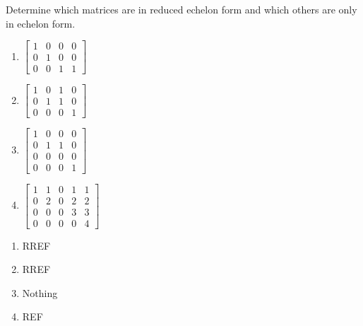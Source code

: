\documentclass{../mathhomework}
\begin{document}
\begin{problem}[1.2\#1]
    Determine which matrices are in reduced echelon form and which others are only in echelon form.
    \begin{enumerate}[label=(\alph*)]
        \item $\begin{bmatrix}
            1 & 0 & 0 & 0 \\
            0 & 1 & 0 & 0 \\
            0 & 0 & 1 & 1
        \end{bmatrix}$
        \item $\begin{bmatrix}
            1 & 0 & 1 & 0 \\
            0 & 1 & 1 & 0 \\
            0 & 0 & 0 & 1
        \end{bmatrix}$
        \item $\begin{bmatrix}
            1 & 0 & 0 & 0 \\
            0 & 1 & 1 & 0 \\
            0 & 0 & 0 & 0 \\
            0 & 0 & 0 & 1
        \end{bmatrix}$
        \item $\begin{bmatrix}
            1 & 1 & 0 & 1 & 1 \\
            0 & 2 & 0 & 2 & 2 \\
            0 & 0 & 0 & 3 & 3 \\
            0 & 0 & 0 & 0 & 4
        \end{bmatrix}$
    \end{enumerate}

    \begin{solution}
        \begin{enumerate}[label=(\alph*)]
            \item RREF
            \item RREF
            \item Nothing
            \item REF
        \end{enumerate}
    \end{solution}
\end{problem}
\end{document}
